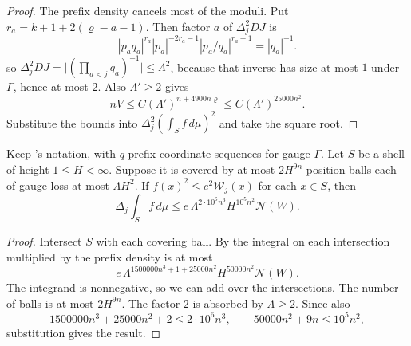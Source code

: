 \begin{proof}
The prefix density cancels most of the moduli. Put $r_a=k+1+2(\varrho-a-1)$. Then
factor $a$ of $\Delta_j^2D J$ is
\[
 |p_aq_a|^{r_a}|p_a|^{-2r_a-1}|p_a/q_a|^{r_a+1}
 = |q_a|^{-1}.
\]
so $\Delta_j^2D J=\lvert(\prod_{a<j}q_a)^{-1}\rvert\le \Lambda^2$,
because that inverse has size at most $1$ under $\Gamma$, hence at most $2$.
Also $\Lambda'\ge2$ gives
\[
 nV\le C(\Lambda')^{n+4900n\varrho}
 \le C(\Lambda')^{25000n^2}.
\]
Substitute the bounds into $\Delta_j^2(\int_S f\,d\mu)^2$ and take the square root.
\end{proof}

\begin{lemma}
\label{lem:b-shell-cover}
\emitthmsource
Keep 's notation, with $q$ prefix coordinate sequences for gauge $\Gamma$.
Let $S$ be a shell of height $1\le H<\infty$.
Suppose it is covered by at most $2H^{9n}$ position balls each of gauge loss at most $\Lambda H^2$.
If $f(x)^2\le e^2\mathcal W_j(x)$ for each $x\in S$, then
\[
 \Delta_j\int_S f\,d\mu\le
 e\,\Lambda^{2\cdot10^6n^3}H^{10^5n^2}\mathcal N(W).
\]
\end{lemma}
\begin{proof}
Intersect $S$ with each covering ball. By  the integral on each intersection
multiplied by the prefix density is at most
\[
 e\,\Lambda^{1500000n^3+1+25000n^2}H^{50000n^2}\mathcal N(W).
\]
The integrand is nonnegative, so we can add over the intersections.
The number of balls is at most $2H^{9n}$. The factor $2$ is absorbed by $\Lambda\ge2$.
Since also
\[
 1500000n^3+25000n^2+2\le2\cdot10^6n^3,\qquad
 50000n^2+9n\le 10^5n^2,
\]
substitution gives the result.
\end{proof}

